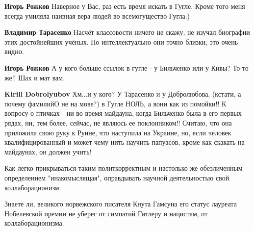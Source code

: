 \begin{itemize}
\begin{itemize}
\textbf{Игорь Рожков} Наверное у Вас, раз есть время искать в Гугле. Кроме того меня всегда умиляла наивная вера людей во всемогущество Гугла:)

 
\textbf{Владимир Тарасенко} Насчёт классовости ничего не скажу, не изучал биографии этих достойнейших учёных. Но интеллектуально они точно близки, это очень видно.

 
\textbf{Игорь Рожков} А у кого больше ссылок в гугле - у Бильченко или у Кивы? То-то же!! Шах и мат вам.

 
\textbf{Kirill Dobrolyubov} Хм...и у кого? У Тарасенко и у Добролюбова, (кстати, а почему фамилийО не на мове?) в Гугле НОЛЬ, а вони как из помойки!! К вопросу о птичках - ни во время майдауна, когда Бильченко была в его первых рядах, ни, тем более, сейчас, не являюсь ее поклонником!! Считаю, что она приложила свою руку к Руине, что наступила на Украине, но, если человек квалифицированный и может чему-нить научить папуасов, кроме как скакать на майдаунах, он должен учить!

\end{itemize}

 

Как легко прикрываться таким политкорректным и настолько же обезличенным
определением "инакомыслящая", оправдывать научной деятельностью свой
коллаборационизм.

Знаете ли, великого норвежского писателя Кнута Гамсуна его статус лауреата
Нобелевской премии не уберег от симпатий Гитлеру и нацистам, от
коллаборационизма.


\end{itemize}
